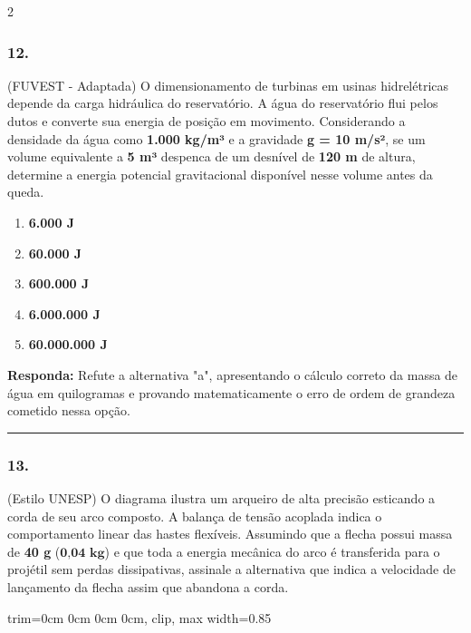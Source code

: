 \documentclass[twoside, 10pt, a4paper]{article}
\newlength{\espacoPreQuestao}\setlength{\espacoPreQuestao}{0.1cm}
\newlength{\espacoQuestao}\setlength{\espacoQuestao}{0.2cm}
\newlength{\espacoAlt}\setlength{\espacoAlt}{0.2cm}
\newcommand{\larguraTikz}{0.85\linewidth}
\begin{document}
\begin{multicols*}{2}
\subsubsection*{12.} (FUVEST - Adaptada) O dimensionamento de turbinas em usinas hidrelétricas depende da carga hidráulica do reservatório. A água do reservatório flui pelos dutos e converte sua energia de posição em movimento. Considerando a densidade da água como \textbf{1.000 kg/m³} e a gravidade \textbf{g = 10 m/s²}, se um volume equivalente a \textbf{5 m³} despenca de um desnível de \textbf{120 m} de altura, determine a energia potencial gravitacional disponível nesse volume antes da queda.
\begin{enumerate}[label=\alph*), itemsep=\espacoAlt]
    \item \textbf{6.000 J}
    \item \textbf{60.000 J}
    \item \textbf{600.000 J}
    \item \textbf{6.000.000 J}
    \item \textbf{60.000.000 J}
\end{enumerate}
\begin{boxresponda}
\textbf{Responda:} Refute a alternativa "a", apresentando o cálculo correto da massa de água em quilogramas e provando matematicamente o erro de ordem de grandeza cometido nessa opção.
\end{boxresponda}
\par\vspace{\espacoQuestao}

\noindent\textcolor{CorLinha}{\rule{\linewidth}{0.5pt}} 
\par\vspace{\espacoPreQuestao}
\subsubsection*{13.} (Estilo UNESP) O diagrama ilustra um arqueiro de alta precisão esticando a corda de seu arco composto. A balança de tensão acoplada indica o comportamento linear das hastes flexíveis. Assumindo que a flecha possui massa de \textbf{40 g} ($ \textbf{0,04 kg} $) e que toda a energia mecânica do arco é transferida para o projétil sem perdas dissipativas, assinale a alternativa que indica a velocidade de lançamento da flecha assim que abandona a corda.
\begin{center}
\begin{adjustbox}{trim=0cm 0cm 0cm 0cm, clip, max width=\larguraTikz}
\end{adjustbox}
\end{center}
\end{multicols*}
\end{document}
